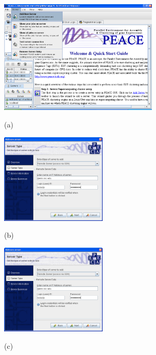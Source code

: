 \documentclass[a4,center,fleqn]{NAR}
\begin{document}
\begin{figure}
  \begin{minipage}{3in}
    \includegraphics[width=3in]{screen.d/install_page_big.png}
    \centerline{\small{(a)}}
  \end{minipage}
  \begin{minipage}{2in}
    \vspace{0.47in}
    \includegraphics[width=2in]{screen.d/add_server_big.png}
    \centerline{\small{(b)}}
  \end{minipage}
  \begin{minipage}{2in}
    \vspace{0.47in}
    \includegraphics[width=2in]{screen.d/add_server_big.png}
    \centerline{\small{(c)}}
  \end{minipage}


\end{figure}
\end{document}
